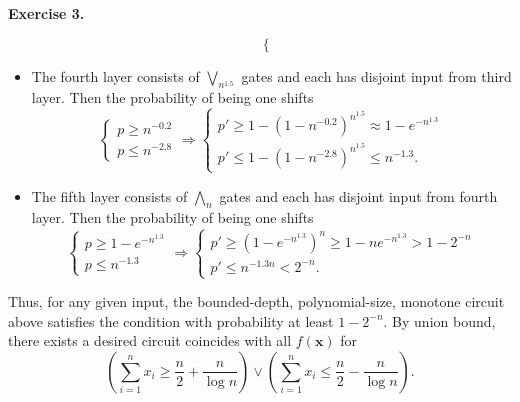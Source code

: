 \documentclass[a4paper]{article}
\newenvironment{exercise}[1]{
	\par
	\noindent\textbf{Exercise #1.}\quad
}{
	\par
	\bigskip
}
\newcommand{\pbra}[1]{\left( #1 \right)}
\begin{document}
\begin{exercise}{3}
\begin{itemize}
$$\begin{cases}
            \end{cases}
            $$
        \item The fourth layer consists of $\bigvee_{n^{1.5}}$ gates and each has disjoint input from third layer.
            Then the probability of being one shifts
            $$
            \begin{cases}
                p\geq n^{-0.2}\\
                p\leq n^{-2.8}
            \end{cases}
            \Rightarrow
            \begin{cases}
                p'\geq1-\pbra{1-n^{-0.2}}^{n^{1.5}}\approx 1-e^{-n^{1.3}}\\
                p'\leq1-\pbra{1-n^{-2.8}}^{n^{1.5}}\leq n^{-1.3}.
            \end{cases}
            $$
        \item The fifth layer consists of $\bigwedge_{n}$ gates and each has disjoint input from fourth layer.
            Then the probability of being one shifts
            $$
            \begin{cases}
                p\geq 1-e^{-n^{1.3}}\\
                p\leq n^{-1.3}
            \end{cases}
            \Rightarrow
            \begin{cases}
                p'\geq\pbra{1-e^{-n^{1.3}}}^n\geq1-ne^{-n^{1.3}}>1-2^{-n}\\
                p'\leq n^{-1.3n}< 2^{-n}.
            \end{cases}
            $$
    \end{itemize}
    Thus, for any given input, the bounded-depth, polynomial-size, monotone circuit above satisfies the condition
    with probability at least $1-2^{-n}$. 
    By union bound, there exists a desired circuit coincides with all $f(\bm x)$ for 
    $$
    \pbra{\sum_{i=1}^nx_i\geq\frac n2+\frac n{\log n}}\lor
    \pbra{\sum_{i=1}^nx_i\leq\frac n2-\frac n{\log n}}.
    $$
\end{exercise}
\end{document}
